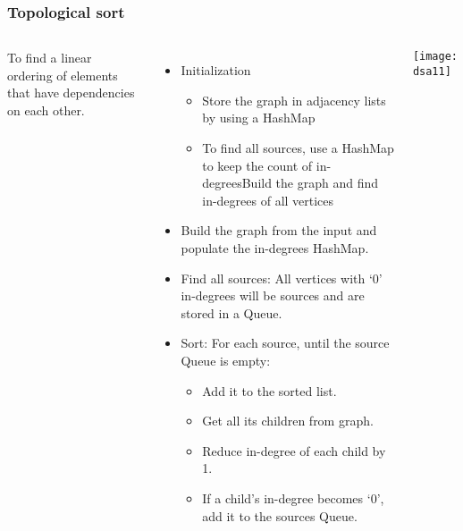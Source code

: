 \begin{frame}[fragile]
	\frametitle{Topological sort}
	\begin{columns}[T]
 	To find a linear ordering of elements that have dependencies on each other.
\begin{itemize}
			\item Initialization
			\begin{itemize}
				\item Store the graph in adjacency lists by using a HashMap
				\item To find all sources, use a HashMap to keep the count of in-degreesBuild the graph and find in-degrees of all vertices
			\end{itemize}
			\item Build the graph from the input and populate the in-degrees HashMap.
			\item Find all sources: All vertices with ‘0’ in-degrees will be sources and are stored in a Queue.
			\item Sort: For each source, until the source Queue is empty:
				\begin{itemize}
					\item Add it to the sorted list.
					\item Get all its children from graph.
					\item Reduce in-degree of each child by 1.
					\item If a child’s in-degree becomes ‘0’, add it to the sources Queue.
				\end{itemize}
			\end{itemize}

			
		
\begin{center}
\texttt{[image: dsa11]}
\end{center}		
		\end{columns}		
\end{frame}